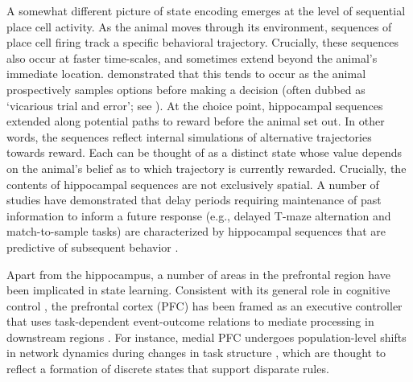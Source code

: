 \documentclass[11pt]{article}
\let\cite=\citep
\let\citeN=\citet
\let\citeNP=\citealt
\begin{document}
A somewhat different picture of state encoding emerges at the level of 
sequential place cell activity. As the animal moves through its environment, 
sequences of place cell firing track a specific behavioral trajectory. 
Crucially, these sequences also occur at faster time-scales, and sometimes 
extend beyond the animal's immediate location. \citeN{Johnson2007} demonstrated 
that this tends to occur as the animal prospectively samples options before 
making a decision (often dubbed as `vicarious trial and error'; see 
\citeNP{Tolman1939,Redish2016}). At the choice point, hippocampal sequences 
extended along potential paths to reward before the animal set out. In other 
words, the sequences reflect internal simulations of alternative trajectories 
towards reward. Each can be thought of as a distinct state whose value depends 
on the animal's belief as to which trajectory is currently rewarded. Crucially, 
the contents of hippocampal sequences are not exclusively spatial. A number of 
studies have demonstrated that delay periods requiring maintenance of past 
information to inform a future response (e.g., delayed T-maze alternation and 
match-to-sample tasks) are characterized by hippocampal sequences that are 
predictive of subsequent behavior 
\cite{Pastalkova2008,MacDonald2011,MacDonald2013}.

Apart from the hippocampus, a number of areas in the prefrontal region have 
been implicated in state learning. Consistent with its general role in 
cognitive control 
\cite{Botvinick2001,Liston2006,Casey2005,Haddon2006,Haddon2007,Braver2012}, the 
prefrontal cortex (PFC) has been framed as an executive controller that uses 
task-dependent event-outcome relations to mediate processing in downstream 
regions \cite{Miller2000}. For instance, medial PFC undergoes population-level 
shifts in network dynamics during changes in task structure 
\cite{Durstewitz2010,Karlsson2012}, which are thought to reflect a formation of 
discrete states that support disparate rules. 
\end{document}
